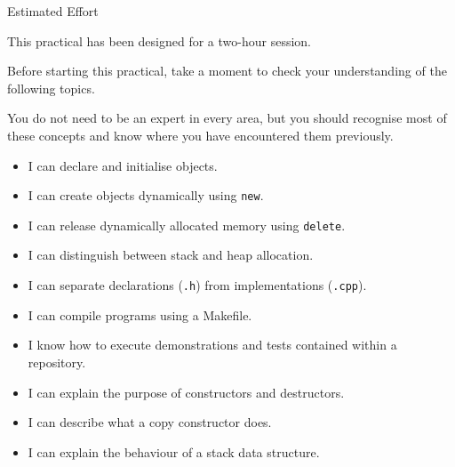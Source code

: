 \documentclass{csc2059practical}
\begin{document}

\begin{infobox}{Estimated Effort}

This practical has been designed for a two-hour session.

\end{infobox}



Before starting this practical, take a moment to check your understanding of
the following topics.

You do not need to be an expert in every area, but you should recognise most
of these concepts and know where you have encountered them previously.

\begin{itemize}

\item I can declare and initialise objects.

\item I can create objects dynamically using \texttt{new}.

\item I can release dynamically allocated memory using
\texttt{delete}.

\item I can distinguish between stack and heap allocation.

\item I can separate declarations (\texttt{.h}) from
implementations (\texttt{.cpp}).

\item I can compile programs using a Makefile.

\item I know how to execute demonstrations and tests contained
within a repository.

\item I can explain the purpose of constructors and destructors.

\item I can describe what a copy constructor does.

\item I can explain the behaviour of a stack data structure.

\end{itemize}
\end{document}
